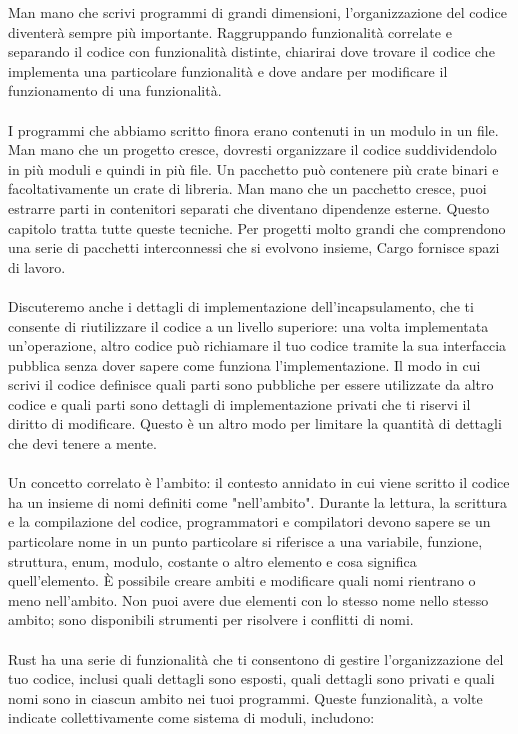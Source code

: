 \documentclass[11pt,a4paper]{article}
\begin{document}
Man mano che scrivi programmi di grandi dimensioni, l'organizzazione del codice diventerà sempre più importante. Raggruppando funzionalità correlate e separando il codice con funzionalità distinte, chiarirai dove trovare il codice che implementa una particolare funzionalità e dove andare per modificare il funzionamento di una funzionalità.\\
\\
I programmi che abbiamo scritto finora erano contenuti in un modulo in un file. Man mano che un progetto cresce, dovresti organizzare il codice suddividendolo in più moduli e quindi in più file. Un pacchetto può contenere più crate binari e facoltativamente un crate di libreria. Man mano che un pacchetto cresce, puoi estrarre parti in contenitori separati che diventano dipendenze esterne. Questo capitolo tratta tutte queste tecniche. Per progetti molto grandi che comprendono una serie di pacchetti interconnessi che si evolvono insieme, Cargo fornisce spazi di lavoro.\\
\\
Discuteremo anche i dettagli di implementazione dell'incapsulamento, che ti consente di riutilizzare il codice a un livello superiore: una volta implementata un'operazione, altro codice può richiamare il tuo codice tramite la sua interfaccia pubblica senza dover sapere come funziona l'implementazione. Il modo in cui scrivi il codice definisce quali parti sono pubbliche per essere utilizzate da altro codice e quali parti sono dettagli di implementazione privati che ti riservi il diritto di modificare. Questo è un altro modo per limitare la quantità di dettagli che devi tenere a mente.\\
\\
Un concetto correlato è l'ambito: il contesto annidato in cui viene scritto il codice ha un insieme di nomi definiti come "nell'ambito". Durante la lettura, la scrittura e la compilazione del codice, programmatori e compilatori devono sapere se un particolare nome in un punto particolare si riferisce a una variabile, funzione, struttura, enum, modulo, costante o altro elemento e cosa significa quell'elemento. È possibile creare ambiti e modificare quali nomi rientrano o meno nell'ambito. Non puoi avere due elementi con lo stesso nome nello stesso ambito; sono disponibili strumenti per risolvere i conflitti di nomi.\\
\\
Rust ha una serie di funzionalità che ti consentono di gestire l'organizzazione del tuo codice, inclusi quali dettagli sono esposti, quali dettagli sono privati e quali nomi sono in ciascun ambito nei tuoi programmi. Queste funzionalità, a volte indicate collettivamente come sistema di moduli, includono:
\end{document}
